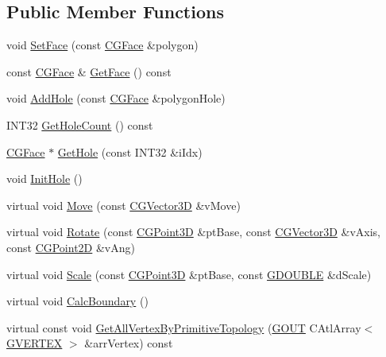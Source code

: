\subsection*{Public Member Functions}
\begin{DoxyCompactItemize}
\item 
void \hyperlink{class_c_g_object_face_ae6d717fd9e7663ac818732f84ae445d9}{Set\+Face} (const \hyperlink{_g_polyline3_d_8h_a3895d72cc762bc25b2c0f67163199b33}{C\+G\+Face} \&polygon)
\item 
const \hyperlink{_g_polyline3_d_8h_a3895d72cc762bc25b2c0f67163199b33}{C\+G\+Face} \& \hyperlink{class_c_g_object_face_a06ec7ce8f383d4e477476ba18c4ddfa6}{Get\+Face} () const 
\item 
void \hyperlink{class_c_g_object_face_a2318bd4c404856329455647fd090f436}{Add\+Hole} (const \hyperlink{_g_polyline3_d_8h_a3895d72cc762bc25b2c0f67163199b33}{C\+G\+Face} \&polygon\+Hole)
\item 
I\+N\+T32 \hyperlink{class_c_g_object_face_a99629727d7c90e644e257974c87aa063}{Get\+Hole\+Count} () const 
\item 
\hyperlink{_g_polyline3_d_8h_a3895d72cc762bc25b2c0f67163199b33}{C\+G\+Face} $\ast$ \hyperlink{class_c_g_object_face_a767745574ee982c4ae67a2a8f7eb111d}{Get\+Hole} (const I\+N\+T32 \&i\+Idx)
\item 
void \hyperlink{class_c_g_object_face_a44b27c37466eb5279bb2fde1b3642020}{Init\+Hole} ()
\item 
virtual void \hyperlink{class_c_g_object_face_ac7c01e88b0dcaf0a375cdbaf197f8428}{Move} (const \hyperlink{_g_point3_d_8h_aa7e73d39f4c991acb5a13c84b498366d}{C\+G\+Vector3\+D} \&v\+Move)
\item 
virtual void \hyperlink{class_c_g_object_face_aec9d6c73b733a7e905122e26c82d0f28}{Rotate} (const \hyperlink{class_c_g_point3_d}{C\+G\+Point3\+D} \&pt\+Base, const \hyperlink{_g_point3_d_8h_aa7e73d39f4c991acb5a13c84b498366d}{C\+G\+Vector3\+D} \&v\+Axis, const \hyperlink{class_c_g_point2_d}{C\+G\+Point2\+D} \&v\+Ang)
\item 
virtual void \hyperlink{class_c_g_object_face_af1d7d0098a85515492350e64722b3829}{Scale} (const \hyperlink{class_c_g_point3_d}{C\+G\+Point3\+D} \&pt\+Base, const \hyperlink{_g_types_8h_afd05ac85f90ee8e2a733928545462cd4}{G\+D\+O\+U\+B\+L\+E} \&d\+Scale)
\item 
virtual void \hyperlink{class_c_g_object_face_a8ec381dd5b3f28312b175957567978dd}{Calc\+Boundary} ()
\item 
virtual const void \hyperlink{class_c_g_object_face_a760d5c147dcaa696afde4cf48a02a9b9}{Get\+All\+Vertex\+By\+Primitive\+Topology} (\hyperlink{_g_types_8h_a0858ec221262e635612871d70ca233ad}{G\+O\+U\+T} C\+Atl\+Array$<$ \hyperlink{struct_g_v_e_r_t_e_x}{G\+V\+E\+R\+T\+E\+X} $>$ \&arr\+Vertex) const 

\end{DoxyCompactItemize}
